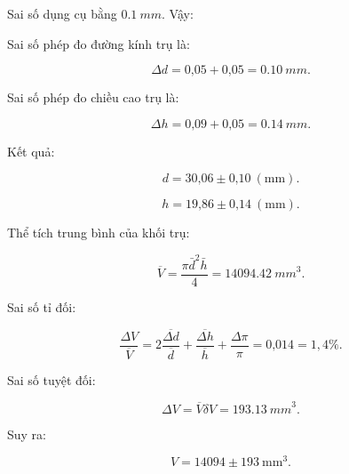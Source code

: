 \begin{enumerate}[label=\bfseries Bài \arabic*:,leftmargin=1.5cm]
{		Sai số dụng cụ bằng $\SI{0,1}{mm}$. Vậy:
		
		Sai số phép đo đường kính trụ là:
		
		$$\Delta d = \text{0,05} + \text{0,05} =\SI{0,10}{mm}.$$
		
		Sai số phép đo chiều cao trụ là:
		
		$$\Delta h = \text{0,09} + \text{0,05} =\SI{0,14}{mm}.$$
		
		Kết quả: 
		
		$$d = \text{30,06} \pm \text{0,10}\ (\text{mm}).$$
		
		$$h = \text{19,86} \pm \text{0,14}\ (\text{mm}).$$
		
		Thể tích trung bình của khối trụ:
		
		$$\overline{V}  = \dfrac{\pi \bar{d}^2 \bar{h}}{4} =\SI{14094.42}{mm}^3.$$
		
		Sai số tỉ đối:
		
		$$\dfrac{\Delta V}{\overline V} = 2 \dfrac{\overline{\Delta d}}{\overline d} + \dfrac{\overline {\Delta h}}{\overline{h}} + \dfrac{\Delta \pi}{\pi} = \text{0,014} = 1,4\%.$$
		
		Sai số tuyệt đối:
		
		$$\Delta V = \overline{V} \delta V = \SI{193.13}{mm}^3.$$
		
		Suy ra:
		
		$$V = 14094 \pm 193 \ \text{mm}^3.$$
		
		
	}
	
\end{enumerate}